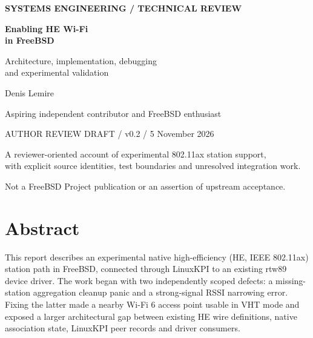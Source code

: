 \documentclass[11pt,letterpaper,oneside]{article}
\begin{document}
\hypersetup{pageanchor=false}
\begin{titlepage}
\thispagestyle{empty}
\vspace*{0.45in}
{\sffamily\small\bfseries\color{teal}SYSTEMS ENGINEERING / TECHNICAL REVIEW\par}
\vspace{0.45in}
{\fontsize{37}{42}\selectfont\bfseries\color{ink}Enabling HE Wi-Fi\\in FreeBSD\par}
\vspace{0.3in}
{\sffamily\Large\color{muted}Architecture, implementation, debugging\\and experimental validation\par}
\vspace{0.5in}
{\Large Denis Lemire\par}
{\sffamily Aspiring independent contributor and FreeBSD enthusiast\par}
\vfill
{}\par
\vspace{0.7in}
{\sffamily\small\color{muted}AUTHOR REVIEW DRAFT / v0.2 / 5 November 2026\par}
{\small A reviewer-oriented account of experimental 802.11ax station support,\\with explicit source identities, test boundaries and unresolved integration work.\par}
\vspace{0.2in}
{\footnotesize Not a FreeBSD Project publication or an assertion of upstream acceptance.\par}
\end{titlepage}
\hypersetup{pageanchor=true}
\section*{Abstract}
This report describes an experimental native high-efficiency (HE, IEEE 802.11ax) station path in FreeBSD, connected through LinuxKPI to an existing rtw89 device driver. The work began with two independently scoped defects: a missing-station aggregation cleanup panic and a strong-signal RSSI narrowing error. Fixing the latter made a nearby Wi-Fi 6 access point usable in VHT mode and exposed a larger architectural gap between existing HE wire definitions, native association state, LinuxKPI peer records and driver consumers.
\end{document}
